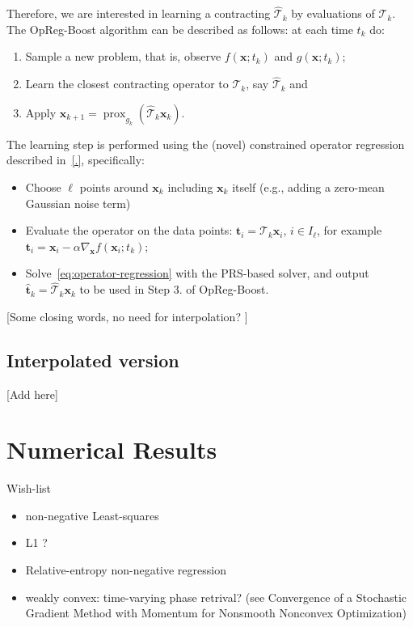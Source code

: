\documentclass{article}
\DeclareMathOperator{\prox}{prox}
\newcommand{\tv}{\mathbold{t}}
\newcommand{\x}{\mathbold{x}}
\newcommand{\T}{\mathcal{T}}
\begin{document}
Therefore, we are interested in learning a contracting $\hat{\T}_k$ by evaluations of $\T_k$. The OpReg-Boost algorithm can be described as follows: at each time $t_k$ do:
\begin{enumerate}
	\item Sample a new problem, that is, observe $f(\x; t_k)$ and $g(\x; t_k)$;

	\item Learn the closest contracting operator to $\T_{k}$, say $\hat{\T}_k$ and
	
	\item Apply $\x_{k+1} = \prox_{g_k} (\hat{\T}_k \x_k)$.
\end{enumerate}
The learning step is performed using the (novel) constrained operator regression described in~\eqref{.}, specifically:

\begin{itemize}
	\item Choose $\ell$ points around $\x_k$ including $\x_k$ itself (e.g., adding a zero-mean Gaussian noise term)
	
	\item Evaluate the operator on the data points: $\tv_i = \T_{k} \x_i$, $i\in I_{\ell}$, for example $\tv_i = \x_i - \alpha \nabla_{\x} f(\x_i; t_k)$;
	
	\item Solve~\eqref{eq:operator-regression} with the PRS-based solver, and output $\hat{\tv}_k = \hat{\T}_k \x_k$ to be used in Step 3. of OpReg-Boost.
\end{itemize}


[Some closing words, no need for interpolation? ]


\subsection{Interpolated version}

[Add here]




\section{Numerical Results}\label{sec:numerical}

Wish-list

\begin{itemize}
\item non-negative Least-squares

\item L1 ? 

\item Relative-entropy non-negative regression

\item weakly convex: time-varying phase retrival? (see Convergence of a Stochastic Gradient Method with Momentum for Nonsmooth Nonconvex Optimization)

\end{itemize}
\end{document}
